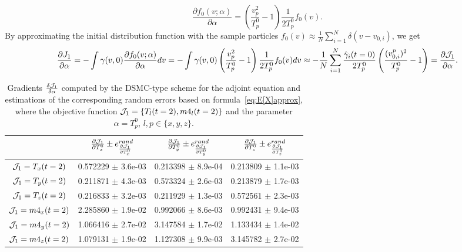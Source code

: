 \documentclass[times,final,nopreprintline]{elsarticle}
\begin{document}
\begin{equation} \label{eq:IC_derivative}
\frac{\partial f_0(v;\alpha)}{\partial \alpha}=\left(\frac{v_p^2}{T_p^0} - 1\right)\frac{1}{2T_p^0} f_0(v).
\end{equation}
By approximating the initial distribution function with the sample particles $f_0(v) \approx  \frac{1}{N} \sum_{i=1}^N \delta(v-v_{0,i})$, we get
\begin{equation} \label{eq:gradient_DSMCtype}
\frac{\partial J_1}{\partial \alpha} = -\int \gamma(v,0)  \frac{\partial f_0(v;\alpha)}{\partial \alpha} dv =-\int \gamma(v,0) \left(\frac{v_p^2}{T_p^0} - 1\right)\frac{1}{2T_p^0} f_0(v)dv \approx -\frac{1}{N}  \sum_{i=1}^N \frac{\hat \gamma_i(t=0)}{2T_p^0}  \left(\frac{(v_{0,i}^p)^2}{T_p^0} - 1\right)  = \frac{\partial \mathcal J_1}{\partial \alpha}.
\end{equation}


\begin{table} %
\small
\setlength{\tabcolsep}{4pt}
\centering 
\begin{tabular}{|c|c|c|c|} 
  \hline
\rule{0pt}{10pt}  & $\frac{\partial \mathcal J_1}{\partial T_x^0} \pm e^{rand}_{\frac{\partial \mathcal J_1}{\partial T_x^0}}$ & $\frac{\partial \mathcal J_1}{\partial T_y^0} \pm e^{rand}_{\frac{\partial \mathcal J_1}{\partial T_y^0}}$ & $\frac{\partial \mathcal J_1}{\partial T_z^0} \pm e^{rand}_{\frac{\partial \mathcal J_1}{\partial T_z^0}}$ \\
  \hline
$\mathcal J_1=T_x(t=2)$  &  0.572229 $\pm$  3.6e-03  &  0.213398 $\pm$  8.9e-04  &  0.213809 $\pm$  1.1e-03  \\
$\mathcal J_1=T_y(t=2)$  &  0.211871 $\pm$  4.3e-03  &  0.573324 $\pm$  2.6e-03  &  0.213879 $\pm$  1.7e-03  \\
$\mathcal J_1=T_z(t=2)$  &  0.216833 $\pm$  3.2e-03  &  0.211929 $\pm$  1.3e-03  &  0.572561 $\pm$  2.3e-03  \\
$\mathcal J_1=m4_x(t=2)$ &  2.285860 $\pm$  1.9e-02  &  0.992066 $\pm$  8.6e-03  &  0.992431 $\pm$  9.4e-03  \\
$\mathcal J_1=m4_y(t=2)$ &  1.066416 $\pm$  2.7e-02  &  3.147584 $\pm$  1.7e-02  &  1.133434 $\pm$  1.4e-02  \\
$\mathcal J_1=m4_z(t=2)$ &  1.079131 $\pm$  1.9e-02  &  1.127308 $\pm$  9.9e-03  &  3.145782 $\pm$  2.7e-02  \\
   \hline
\end{tabular} 
  \caption{Gradients $\frac{\delta \mathcal J_1}{\delta \alpha}$ computed by the DSMC-type scheme for the adjoint equation and estimations of the corresponding random errors based on formula~\eqref{eq:E[X]approx}, where the objective function $\mathcal J_1=\{T_l(t=2),m4_l(t=2)\}$ and the parameter $\alpha=T_p^0$, $l,p\in\{x,y,z\}$.}\label{Table5}
\end{table} 
\end{document}
